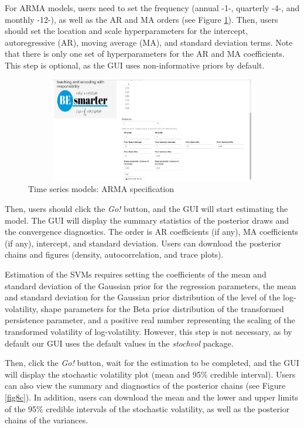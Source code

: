 For ARMA models, users need to set the frequency (annual -1-, quarterly -4-, and monthly -12-), as well as the AR and MA orders (see Figure \ref{fig8b}). Then, users should set the location and scale hyperparameters for the intercept, autoregressive (AR), moving average (MA), and standard deviation terms. Note that there is only one set of hyperparameters for the AR and MA coefficients. This step is optional, as the GUI uses non-informative priors by default.

\begin{figure}
	\includegraphics[width=340pt, height=130pt]{Chapters/chapterGUI/figures/Figure8b.jpg}
	\caption[List of figure caption goes here]{Time series models: ARMA specification}\label{fig8b}
\end{figure}

Then, users should click the \textit{Go!} button, and the GUI will start estimating the model. The GUI will display the summary statistics of the posterior draws and the convergence diagnostics. The order is AR coefficients (if any), MA coefficients (if any), intercept, and standard deviation. Users can download the posterior chains and figures (density, autocorrelation, and trace plots).

Estimation of the SVMs requires setting the coefficients of the mean and standard deviation of the Gaussian prior for the regression parameters, the mean and standard deviation for the Gaussian prior distribution of the level of the log-volatility, shape parameters for the Beta prior distribution of the transformed persistence parameter, and a positive real number representing the scaling of the transformed volatility of log-volatility. However, this step is not necessary, as by default our GUI uses the default values in the \textit{stochvol} package.

Then, click the \textit{Go!} button, wait for the estimation to be completed, and the GUI will display the stochastic volatility plot (mean and 95\% credible interval). Users can also view the summary and diagnostics of the posterior chains (see Figure \ref{fig8c}). In addition, users can download the mean and the lower and upper limits of the 95\% credible intervals of the stochastic volatility, as well as the posterior chains of the variances.

